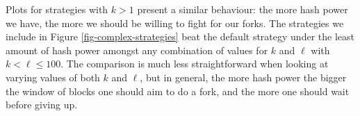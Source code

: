 \documentclass[a4paper,english,cleveref, autoref,numberwithinsect]{lipics-v2019}
\begin{document}
Plots for strategies with $k > 1$ present a similar behaviour: the more hash power we have, the more we should be willing to fight for our forks. The strategies we include 
in Figure \ref{fig-complex-strategies} beat the default strategy under the least amount of hash power 
amongst any combination of values for $k$ and $\ell$ with $k < \ell \leq 100$. The comparison is much less straightforward when looking at varying values of both $k$ and $\ell$, but in general, 
the more hash power the bigger the window of blocks one should aim to do a fork, and the more one should wait before giving up. 



\end{document}

